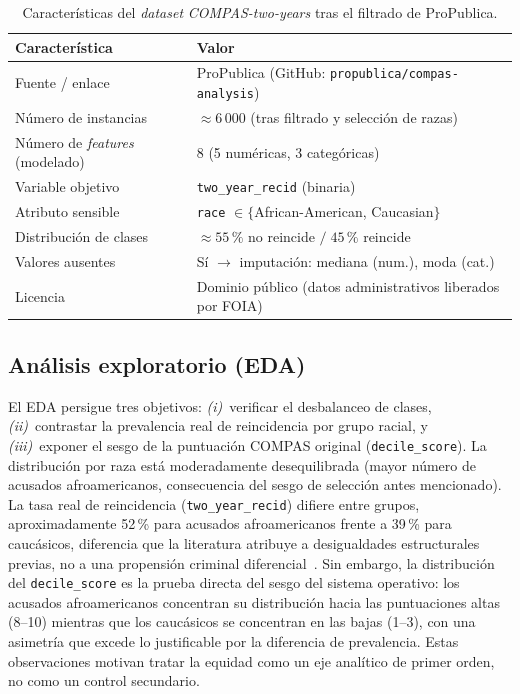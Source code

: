\documentclass[11pt,a4paper]{article}
\begin{document}
\begin{table}[H]
\centering
\caption{Características del \textit{dataset} \textit{COMPAS-two-years} tras el filtrado de ProPublica.}
\label{tab:dataset}
\small
\begin{tabular}{@{}ll@{}}
\toprule
\textbf{Característica} & \textbf{Valor} \\
\midrule
Fuente / enlace           & ProPublica (GitHub: \texttt{propublica/compas-analysis}) \\
Número de instancias      & $\approx 6\,000$ (tras filtrado y selección de razas) \\
Número de \textit{features} (modelado) & 8 (5 numéricas, 3 categóricas)\\
Variable objetivo         & \texttt{two\_year\_recid} (binaria) \\
Atributo sensible         & \texttt{race} $\in\{$African-American, Caucasian$\}$ \\
Distribución de clases    & $\approx 55\,\%$ no reincide $/\;45\,\%$ reincide \\
Valores ausentes          & Sí $\to$ imputación: mediana (num.), moda (cat.) \\
Licencia                  & Dominio público (datos administrativos liberados por FOIA) \\
\bottomrule
\end{tabular}
\end{table}

\subsection{Análisis exploratorio (EDA)}

El EDA persigue tres objetivos: \emph{(i)}~verificar el desbalanceo de clases, \emph{(ii)}~contrastar la prevalencia real de reincidencia por grupo racial, y \emph{(iii)}~exponer el sesgo de la puntuación COMPAS original (\texttt{decile\_score}). La distribución por raza está moderadamente desequilibrada (mayor número de acusados afroamericanos, consecuencia del sesgo de selección antes mencionado). La tasa real de reincidencia (\texttt{two\_year\_recid}) difiere entre grupos, aproximadamente 52\,\% para acusados afroamericanos frente a 39\,\% para caucásicos, diferencia que la literatura atribuye a desigualdades estructurales previas, no a una propensión criminal diferencial~\cite{barocas2019fairness}. Sin embargo, la distribución del \texttt{decile\_score} es la prueba directa del sesgo del sistema operativo: los acusados afroamericanos concentran su distribución hacia las puntuaciones altas (8--10) mientras que los caucásicos se concentran en las bajas (1--3), con una asimetría que excede lo justificable por la diferencia de prevalencia. Estas observaciones motivan tratar la equidad como un eje analítico de primer orden, no como un control secundario.
\end{document}
